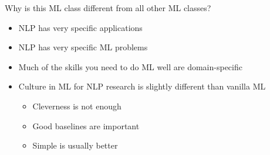 \documentclass[compress]{beamer}
\begin{document}
\begin{frame}{Why is this ML class different from all other ML classes?}

\begin{itemize}
  \item NLP has very specific applications
  \item NLP has very specific ML problems
  \item Much of the skills you need to do ML well are domain-specific
  \item Culture in ML for NLP research is slightly different than
    vanilla ML
    \begin{itemize}
      \item Cleverness is not enough
      \item Good baselines are important
      \item Simple is usually better
    \end{itemize}
\end{itemize}

\end{frame}
\end{document}
